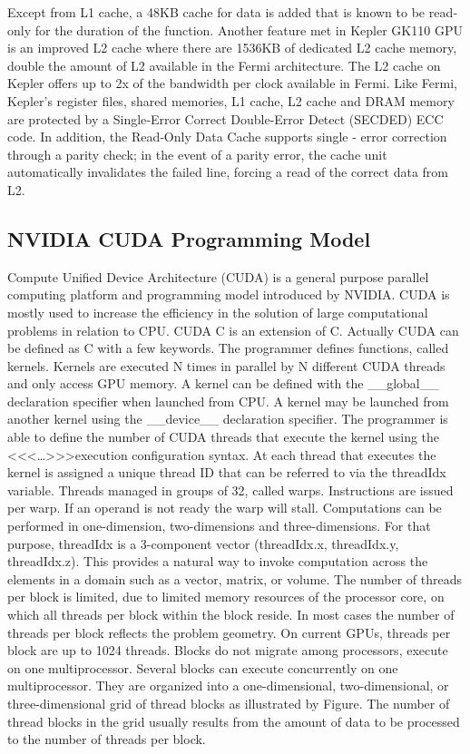 Except from L1 cache, a 48KB cache for data is added that is known to be read‐only for the duration of the function. Another feature met in Kepler GK110 GPU is an improved L2 cache where there are 1536KB of dedicated L2 cache memory, double the amount of L2 available in the Fermi architecture. The L2 cache on Kepler offers up to 2x of the bandwidth per clock available in Fermi. Like Fermi, Kepler’s register files, shared memories, L1 cache, L2 cache and DRAM memory are protected by a Single‐Error Correct Double‐Error Detect (SECDED) ECC code. In addition, the Read‐Only Data Cache supports single - error correction through a parity check; in the event of a parity error, the cache unit automatically invalidates the failed line, forcing a read of the correct data from L2.



\subsection{NVIDIA CUDA Programming Model}
Compute Unified Device Architecture (CUDA) is a general purpose parallel computing platform and programming model introduced by NVIDIA. CUDA is mostly used to increase the efficiency in the solution of large computational problems in relation to CPU.
CUDA C is an extension of C. Actually CUDA can be defined as C with a few keywords. The programmer defines functions, called kernels. Kernels are executed N times in parallel by N different CUDA threads and only access GPU memory. A kernel can be defined with the \_\_global\_\_ declaration specifier when launched from CPU. A kernel may be launched from another kernel using the \_\_device\_\_ declaration specifier. The programmer is able to define the number of CUDA threads that execute the kernel using the <<<…>>>execution configuration syntax. At each thread that executes the kernel is assigned a unique thread ID that can be referred to via the threadIdx variable. Threads managed in groups of 32, called warps. Instructions are issued per warp. If an operand is not ready the warp will stall. Computations can be performed in one-dimension, two-dimensions and three-dimensions. For that purpose, threadIdx is a 3-component vector (threadIdx.x, threadIdx.y, threadIdx.z). This provides a natural way to invoke computation across the elements in a domain such as a vector, matrix, or volume. The number of threads per block is limited, due to limited memory resources of the processor core, on which all threads per block within the block reside. In most cases the number of threads per block reflects the problem geometry. On current GPUs, threads per block are up to 1024 threads. Blocks do not migrate among processors, execute on one multiprocessor. Several blocks can execute concurrently on one multiprocessor. They are organized into a one-dimensional, two-dimensional, or three-dimensional grid of thread blocks as illustrated by Figure. The number of thread blocks in the grid usually results from the amount of data to be processed to the number of threads per block. 
